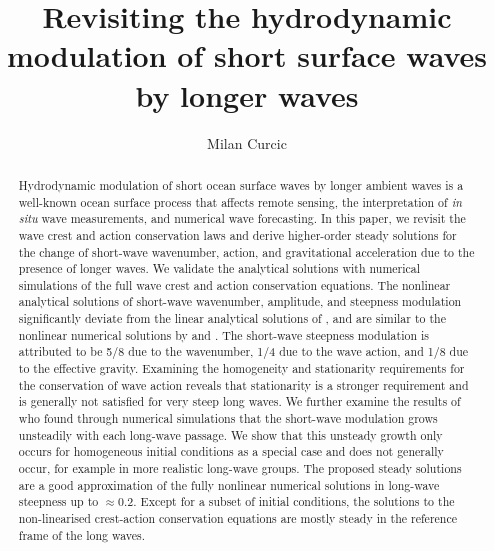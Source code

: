 \documentclass[lineno]{jfm}
\title{Revisiting the hydrodynamic modulation of short surface waves by longer waves}
\author{
  Milan Curcic\aff{1}
  \corresp{\email{mcurcic@miami.edu}}
}
\affiliation{
  \aff{1}Rosenstiel School of Marine, Atmospheric, and Earth Science, University of Miami, Miami, FL
  \aff{2}Frost Institute for Data Science and Computing, University of Miami, Coral Gables, FL
}
\begin{document}
\maketitle

\begin{abstract}
Hydrodynamic modulation of short ocean surface waves by longer ambient waves is
a well-known ocean surface process that affects remote sensing, the
interpretation of \textit{in situ} wave measurements, and numerical wave
forecasting.
In this paper, we revisit the wave crest and action conservation laws and derive
higher-order steady solutions for the change of short-wave wavenumber, action,
and gravitational acceleration due to the presence of longer waves.
We validate the analytical solutions with numerical simulations of the full wave
crest and action conservation equations.
The nonlinear analytical solutions of short-wave wavenumber, amplitude, and
steepness modulation significantly deviate from the linear analytical solutions
of \citet{longuet1960changes}, and are similar to the nonlinear numerical
solutions by \citet{longuet1987propagation} and \citet{zhang1990evolution}.
The short-wave steepness modulation is attributed to be 5/8 due to the
wavenumber, 1/4 due to the wave action, and 1/8 due to the effective gravity.
Examining the homogeneity and stationarity requirements for the conservation of
wave action reveals that stationarity is a stronger requirement and is
generally not satisfied for very steep long waves.
We further examine the results of \citet{peureux2021unsteady} who found through
numerical simulations that the short-wave modulation grows unsteadily with
each long-wave passage.
We show that this unsteady growth only occurs for homogeneous initial
conditions as a special case and does not generally occur, for example in more
realistic long-wave groups.
The proposed steady solutions are a good approximation of the fully
nonlinear numerical solutions in long-wave steepness up to $\approx$0.2.
Except for a subset of initial conditions, the solutions to the non-linearised
crest-action conservation equations are mostly steady in the reference frame of
the long waves.
\end{abstract}

\begin{keywords}
\end{keywords}
\end{document}

